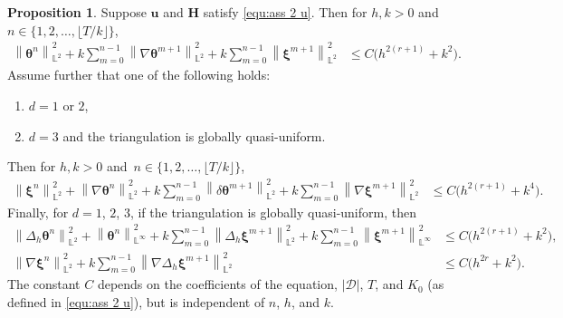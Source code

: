 \documentclass[11pt, reqno]{amsart}
\theoremstyle{definition}
\newtheorem{proposition}[theorem]{Proposition}
\theoremstyle{remark}
\numberwithin{equation}{section}
\newcommand{\bff}{\boldsymbol}
\newcommand{\bb}{\mathbb}
\newcommand{\norm}[2]{\left\|{#1}\right\|_{#2}}
\begin{document}
\begin{proposition}\label{pro:theta xi n half euler}
	Suppose $\bff{u}$ and $\bff{H}$ satisfy \eqref{equ:ass 2 u}. Then for $h, k>0$ and~$n\in \{1,2,\ldots,\lfloor T/k \rfloor\}$,
	\begin{align}\label{equ:theta n L2 euler}
		\norm{\bff{\theta}^n}{\bb{L}^2}^2
		+
		k \sum_{m=0}^{n-1} \norm{\nabla \bff{\theta}^{m+1}}{\bb{L}^2}^2
		+
		k \sum_{m=0}^{n-1} \norm{\bff{\xi}^{m+1}}{\bb{L}^2}^2
		&\leq
		C \big(h^{2(r+1)}+k^2 \big).
	\end{align}
	Assume further that one of the following holds:
	\begin{enumerate}
		\item $d=1$ or $2$,
		\item $d=3$ and the triangulation is globally quasi-uniform.
	\end{enumerate}
	Then for $h, k>0$ and~$n\in \{1,2,\ldots,\lfloor T/k \rfloor\}$,
	\begin{align}
		\label{equ:xi nab theta n L2 euler}
		\norm{\bff{\xi}^n}{\bb{L}^2}^2
		+
		\norm{\nabla \bff{\theta}^{n}}{\bb{L}^2}^2
		+
		k \sum_{m=0}^{n-1} \norm{\delta \bff{\theta}^{m+1}}{\bb{L}^2}^2
		+
		k \sum_{m=0}^{n-1} \norm{\nabla \bff{\xi}^{m+1}}{\bb{L}^2}^2
		&\leq
		C \big(h^{2(r+1)}+k^4 \big).
	\end{align}
	Finally, for $d=1$, $2$, $3$, if the triangulation is globally quasi-uniform, then
	\begin{align}\label{equ:Delta theta n L2 euler}
		\norm{\Delta_h \bff{\theta}^{n}}{\bb{L}^2}^2
		+
		\norm{\bff{\theta}^{n}}{\bb{L}^\infty}^2
		+
		k\sum_{m=0}^{n-1} \norm{\Delta_h \bff{\xi}^{m+1}}{\bb{L}^2}^2
		+
		k\sum_{m=0}^{n-1} \norm{\bff{\xi}^{m+1}}{\bb{L}^\infty}^2
		&\leq
		C \big(h^{2(r+1)}+k^2 \big),
		\\
		\label{equ:nab xi n L2 euler}
		\norm{\nabla \bff{\xi}^n}{\bb{L}^2}^2
		+
		k \sum_{m=0}^{n-1} \norm{\nabla \Delta_h \bff{\xi}^{m+1}}{\bb{L}^2}^2
		&\leq
		C \big(h^{2r}+k^2 \big).
	\end{align}
	The constant $C$ depends on the coefficients of the equation, $|\mathscr{D}|$, $T$, and $K_0$ (as defined in \eqref{equ:ass 2 u}), but is independent of $n$, $h$, and $k$.
\end{proposition}
\end{document}
